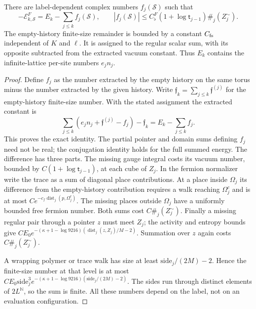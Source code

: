 \documentclass[11pt,letterpaper,reqno]{amsart}
\makeatletter
\theoremstyle{definition}
\newcommand{\ms@minorstart}{%
  \pushQED{\qed}\renewcommand{\qedsymbol}{$\blacksquare$}}
\newenvironment{lemma}[1][]{\ms@minorstart\ms@lemma[#1]}
  {\popQED\endms@lemma}
\theoremstyle{remark}
\makeatother
\begin{document}
\begin{lemma}[The vacuum constant of a label]\label{C-399-24}
There are label-dependent complex numbers $f_j(\mathcal S)$ such
that
\[
 -\mathcal E^F_{k,\mathcal S}=E_k-\sum_{j\le k}f_j(\mathcal S),
 \qquad
 |f_j(\mathcal S)|\le C_\flat^F(1+\log\mathsf t_{j-1})
             \#_j(Z_j^\sim).
\]
The empty-history finite-size remainder is bounded by a
constant $C_{\rm fs}$ independent of $K$ and $\ell$.
It is assigned to the regular scalar sum, with its opposite
subtracted from the extracted vacuum constant. Thus $E_k$
contains the infinite-lattice per-site numbers $e_jn_j$.
\end{lemma}
\begin{proof}
Define $f_j$ as the number extracted by the empty history on
the same torus minus the number extracted by the given history.
Write $\mathfrak f_k=\sum_{j\le k}\mathfrak f^{(j)}$
for the empty-history finite-size number. With the stated
assignment the extracted constant is
\[
 \sum_{j\le k}(e_jn_j+\mathfrak f^{(j)}-f_j)
                     -\mathfrak f_k=E_k-\sum_{j\le k}f_j.
\]
This proves the exact identity. The partial pointer and domain
sums defining $f_j$ need not be real; the conjugation identity
holds for the full summed energy. The difference has
three parts. The missing gauge integral costs its vacuum
number, bounded by $C(1+\log\mathsf t_{j-1})$, at each cube
of $Z_j$. In the fermion normalizer write the trace as a sum
of diagonal place contributions. At a place inside $\Omega_j$
its difference from the empty-history contribution requires a
walk reaching $\Omega_j^c$ and is at most
$Ce^{-c_f\operatorname{dist}_j(p,\Omega_j^c)}$.
The missing places outside $\Omega_j$ have a uniformly bounded
free fermion number. Both sums cost $C\#_j(Z_j^\sim)$.
Finally a missing regular pair through a pointer $z$ must meet
$Z_j$; the activity and entropy bounds give
$CE_0e^{-(\kappa+1-\log9216)
(\operatorname{dist}_j(z,Z_j)/M-2)}$.
Summation over $z$ again costs $C\#_j(Z_j^\sim)$.

A wrapping polymer or trace walk has size at least
$\mathrm{side}_j/(2M)-2$. Hence the finite-size number at that
level is at most
$CE_0\mathrm{side}_j^3
e^{-(\kappa+1-\log9216)(\mathrm{side}_j/(2M)-2)}$.
The sides run through distinct elements of $2L^{\mathbb N}$,
so the sum is finite. All these numbers depend on the label,
not on an evaluation configuration.
\end{proof}
\end{document}
